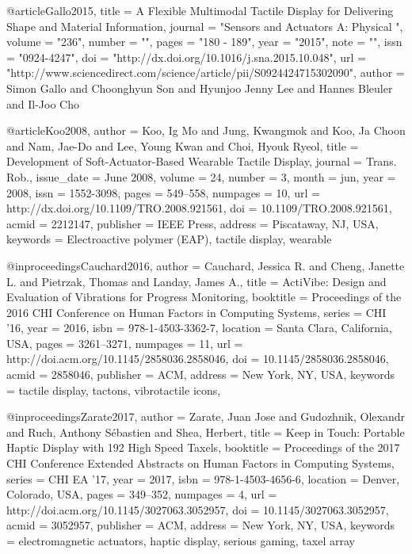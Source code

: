 @article{Gallo2015,
title = {{A Flexible Multimodal Tactile Display for Delivering Shape and Material Information}},
journal = "Sensors and Actuators A: Physical ",
volume = "236",
number = "",
pages = "180 - 189",
year = "2015",
note = "",
issn = "0924-4247",
doi = "http://dx.doi.org/10.1016/j.sna.2015.10.048",
url = "http://www.sciencedirect.com/science/article/pii/S0924424715302090",
author = {Simon Gallo and Choonghyun Son and Hyunjoo Jenny Lee and Hannes Bleuler and Il-Joo Cho}
}

@article{Koo2008,
 author = {Koo, Ig Mo and Jung, Kwangmok and Koo, Ja Choon and Nam, Jae-Do and Lee, Young Kwan and Choi, Hyouk Ryeol},
 title = {{Development of Soft-Actuator-Based Wearable Tactile Display}},
 journal = {Trans. Rob.},
 issue_date = {June 2008},
 volume = {24},
 number = {3},
 month = jun,
 year = {2008},
 issn = {1552-3098},
 pages = {549--558},
 numpages = {10},
 url = {http://dx.doi.org/10.1109/TRO.2008.921561},
 doi = {10.1109/TRO.2008.921561},
 acmid = {2212147},
 publisher = {IEEE Press},
 address = {Piscataway, NJ, USA},
 keywords = {Electroactive polymer (EAP), tactile display, wearable}
} 

@inproceedings{Cauchard2016,
 author = {Cauchard, Jessica R. and Cheng, Janette L. and Pietrzak, Thomas and Landay, James A.},
 title = {{ActiVibe: Design and Evaluation of Vibrations for Progress Monitoring}},
 booktitle = {Proceedings of the 2016 CHI Conference on Human Factors in Computing Systems},
 series = {CHI '16},
 year = {2016},
 isbn = {978-1-4503-3362-7},
 location = {Santa Clara, California, USA},
 pages = {3261--3271},
 numpages = {11},
 url = {http://doi.acm.org/10.1145/2858036.2858046},
 doi = {10.1145/2858036.2858046},
 acmid = {2858046},
 publisher = {ACM},
 address = {New York, NY, USA},
 keywords = {tactile display, tactons, vibrotactile icons},
} 

@inproceedings{Zarate2017,
	author = {Zarate, Juan Jose and Gudozhnik, Olexandr and Ruch, Anthony S{\'e}bastien and Shea, Herbert},
	title = {{Keep in Touch: Portable Haptic Display with 192 High Speed Taxels}},
	booktitle = {Proceedings of the 2017 CHI Conference Extended Abstracts on Human Factors in Computing Systems},
	series = {CHI EA '17},
	year = {2017},
	isbn = {978-1-4503-4656-6},
	location = {Denver, Colorado, USA},
	pages = {349--352},
	numpages = {4},
	url = {http://doi.acm.org/10.1145/3027063.3052957},
	doi = {10.1145/3027063.3052957},
	acmid = {3052957},
	publisher = {ACM},
	address = {New York, NY, USA},
	keywords = {electromagnetic actuators, haptic display, serious gaming, taxel array}
}

